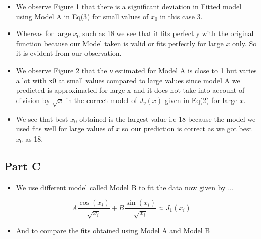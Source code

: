 \documentclass[a4paper,10pt]{article}
\providecommand{\tightlist}{%
      \setlength{\itemsep}{0pt}\setlength{\parskip}{0pt}}
\begin{document}
\begin{itemize}
\tightlist
\item
  We observe Figure 1 that there is a significant deviation in Fitted
  model using Model A in Eq(3) for small values of \(x_0\) in this case
  3.
\item
  Whereas for large \(x_0\) such as 18 we see that it fits perfectly
  with the original function because our Model taken is valid or fits
  perfectly for large \(x\) only. So it is evident from our observation.
\item
  We observe Figure 2 that the \(\nu\) estimated for Model A is close to
  1 but varies a lot with x0 at small values compared to large values
  since model A we predicted is approximated for large x and it does not
  take into account of division by \(\sqrt{x}\) in the correct model of
  \(J_{v}(x)\) given in Eq(2) for large \(x\).
\item
  We see that best \(x_{0}\) obtained is the largest value i.e 18
  because the model we used fits well for large values of \(x\) so our
  prediction is correct as we got best \(x_0\) as 18.
\end{itemize}

    \subsection{Part C}\label{part-c}

\begin{itemize}
\tightlist
\item
  We use different model called Model B to fit the data now given by ...
\end{itemize}

\begin{equation}
   A\frac{\cos(x_{i})}{\sqrt{x_i}}+B\frac{\sin(x_{i})}{\sqrt{x_i}} \approx J_{1}(x_{i})
   \end{equation}

\begin{itemize}
\tightlist
\item
  And to compare the fits obtained using Model A and Model B
\end{itemize}
\end{document}

